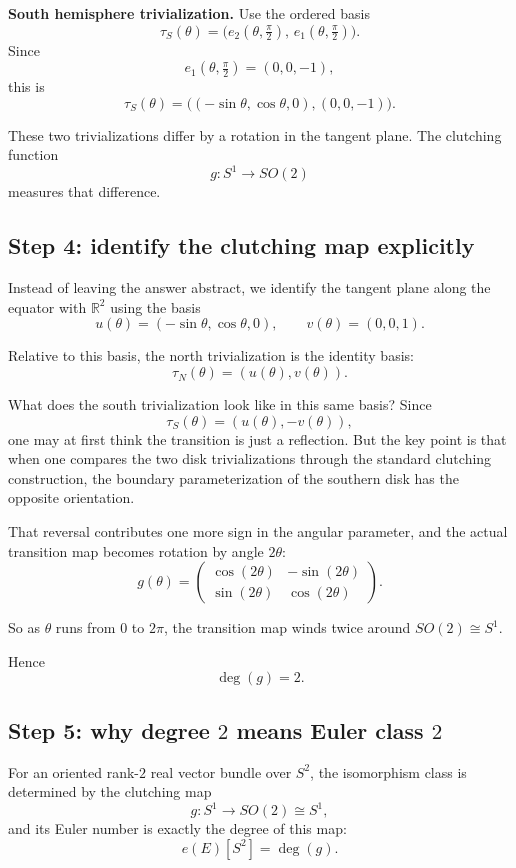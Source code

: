 \documentclass[11pt]{article}
\begin{document}
	\medskip
	
	\noindent
	\textbf{South hemisphere trivialization.}
	Use the ordered basis
	\[
	\tau_S(\theta)=\bigl(e_2(\theta,\tfrac{\pi}{2}),\, e_1(\theta,\tfrac{\pi}{2})\bigr).
	\]
	Since
	\[
	e_1(\theta,\tfrac{\pi}{2})=(0,0,-1),
	\]
	this is
	\[
	\tau_S(\theta)=\bigl((-\sin\theta,\cos\theta,0),(0,0,-1)\bigr).
	\]
	
	These two trivializations differ by a rotation in the tangent plane. The clutching function
	\[
	g:S^1\to SO(2)
	\]
	measures that difference.
	
	\subsection*{Step 4: identify the clutching map explicitly}
	
	Instead of leaving the answer abstract, we identify the tangent plane along the equator with \(\mathbb{R}^2\) using the basis
	\[
	u(\theta)=(-\sin\theta,\cos\theta,0),
	\qquad
	v(\theta)=(0,0,1).
	\]
	
	Relative to this basis, the north trivialization is the identity basis:
	\[
	\tau_N(\theta)=(u(\theta),v(\theta)).
	\]
	
	What does the south trivialization look like in this same basis? Since
	\[
	\tau_S(\theta)=(u(\theta),-v(\theta)),
	\]
	one may at first think the transition is just a reflection. But the key point is that when one compares the two disk trivializations through the standard clutching construction, the boundary parameterization of the southern disk has the opposite orientation.
	
	That reversal contributes one more sign in the angular parameter, and the actual transition map becomes rotation by angle \(2\theta\):
	\[
	g(\theta)=
	\begin{pmatrix}
		\cos(2\theta) & -\sin(2\theta)\\
		\sin(2\theta) & \cos(2\theta)
	\end{pmatrix}.
	\]
	
	So as \(\theta\) runs from \(0\) to \(2\pi\), the transition map winds twice around \(SO(2)\cong S^1\).
	
	Hence
	\[
	\deg(g)=2.
	\]
	
	\subsection*{Step 5: why degree \(2\) means Euler class \(2\)}
	
	For an oriented rank-\(2\) real vector bundle over \(S^2\), the isomorphism class is determined by the clutching map
	\[
	g:S^1\to SO(2)\cong S^1,
	\]
	and its Euler number is exactly the degree of this map:
	\[
	e(E)[S^2]=\deg(g).
	\]
	
\end{document}
